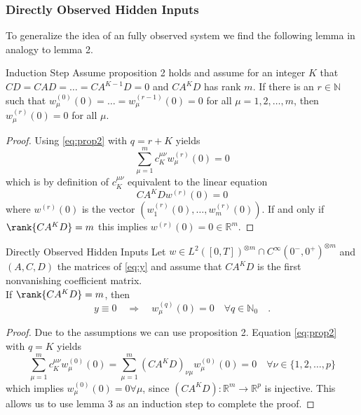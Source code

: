 \subsubsection{Directly Observed Hidden Inputs}
To generalize the idea of an fully observed system we find the following lemma in analogy 
to lemma 2.
\begin{lemma}{Induction Step}{}
	Assume proposition 2 holds and assume for an integer $K$ 
	that $CD=CAD=\ldots = CA^{K-1}D = 0$ and $CA^KD$ has rank $m$. If there is an $r\in
	\mathbb{N}$ such that $w_\mu^{(0)}(0)=\ldots =w_\mu^{(r-1)}(0)=0$ for all $\mu =
	1,2,\ldots , m$, then $w_\mu^{(r)}(0)=0$ for all $\mu$.
\end{lemma}
\begin{proof}
	Using \eqref{eq:prop2} with $q=r+K$ yields
	\begin{equation}
	\sum\limits_{\mu=1}^m c_K^{\mu\nu} w_\mu^{(r)}(0) = 0
	\end{equation}
	which is by definition of $c_K^{\mu\nu}$ equivalent to the linear equation 
	\begin{equation}
	CA^K D w^{(r)} (0) = 0
	\end{equation}
	where $w^{(r)}(0)$ is the vector $(w_1^{(r)}(0),\ldots,w_m^{(r)}(0))$. If and only if 
	$\rank{CA^KD} = m$ this implies $w^{(r)}(0)=0\in\mathbb{R}^m$.
\end{proof}

\begin{theorem}{Directly Observed Hidden Inputs}{}
	Let $w\in L^2([0,T])^{\otimes m}\cap C^\infty(0^-,0^+)^{\otimes m}$ and $(A,C,D)$ the 
	matrices of 
	\eqref{eq:y} and assume that $CA^KD$ is the first nonvanishing coefficient matrix.\\ If 
	$\rank{CA^KD} = m$, then
	\begin{equation}
	y \equiv 0 \quad \Rightarrow \quad w_\mu^{(q)}(0) = 0 \quad \forall q\in\mathbb{N}_0
	\quad .
\end{equation}	 
\end{theorem}
\begin{proof}
	Due to the assumptions we can use proposition 2. Equation \eqref{eq:prop2} with 
	$q = K$ yields
	\begin{equation}
	\sum\limits_{\mu=1}^m c_K^{\mu\nu} w_\mu^{(0)}(0) = 
	\sum\limits_{\mu=1}^m \left( CA^KD\right)_{\nu\mu} w_\mu^{(0)}(0)= 0 \quad \forall 
	\nu \in \{1,2,\ldots, p\}
	\end{equation}
	which implies $w_\mu^{(0)}(0)=0\forall \mu$, since $(CA^KD):\mathbb{R}^m
	\to\mathbb{R}^p$ is injective. This allows us to use lemma 3 as an induction step to 
	complete the proof.
\end{proof}

